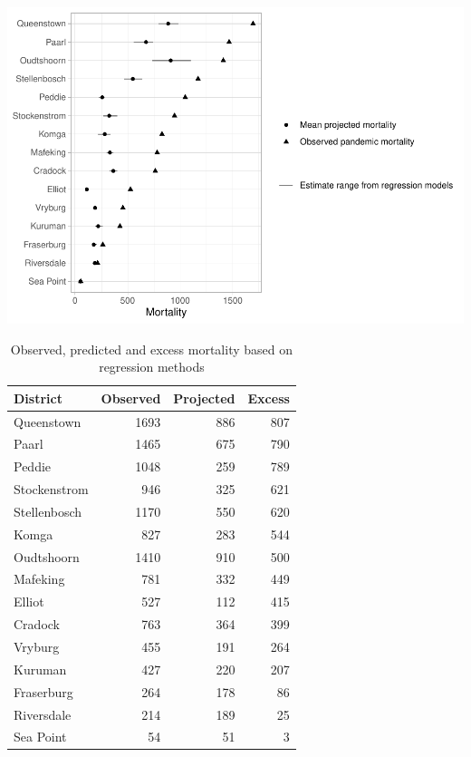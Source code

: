 \documentclass[fleqn,10pt,lineno]{wlpeerj} %
\begin{document}
\includegraphics{spanish-flu-mortality_bookdown_files/figure-latex/unnamed-chunk-6-1.pdf}

\begin{table}

\caption{\label{tab:unnamed-chunk-7}Observed, predicted and excess mortality based on regression methods}
\centering
\begin{tabular}[t]{l|r|r|r}
\hline
District & Observed & Projected & Excess\\
\hline
Queenstown & 1693 & 886 & 807\\
\hline
Paarl & 1465 & 675 & 790\\
\hline
Peddie & 1048 & 259 & 789\\
\hline
Stockenstrom & 946 & 325 & 621\\
\hline
Stellenbosch & 1170 & 550 & 620\\
\hline
Komga & 827 & 283 & 544\\
\hline
Oudtshoorn & 1410 & 910 & 500\\
\hline
Mafeking & 781 & 332 & 449\\
\hline
Elliot & 527 & 112 & 415\\
\hline
Cradock & 763 & 364 & 399\\
\hline
Vryburg & 455 & 191 & 264\\
\hline
Kuruman & 427 & 220 & 207\\
\hline
Fraserburg & 264 & 178 & 86\\
\hline
Riversdale & 214 & 189 & 25\\
\hline
Sea Point & 54 & 51 & 3\\
\hline
\end{tabular}
\end{table}
\end{document}
